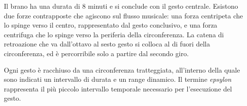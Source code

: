 \documentclass{book}
\begin{document}
\def\circleRadius{11cm}  %
\def\numCards{11}  %
\def\angleOffset{30}  %
\def\pointWidth{3pt}
\def\minimumSize{1.5pt}
\def\arrowWidth{6pt}
\def\arrowLength{9pt}
\def\sumWidth{1pt}
\def\lineWidthMore{3pt}
\def\lineWidthMedium{\lineWidthMore-1.5}
\def\lineWidth{\lineWidthMore-2.5pt}
\def\arrowWidthMore{9pt}
\def\arrowLengthMore{12pt}
\def\sumWidthMore{3pt}
\def\roundedCorners{8pt}
\def\cardRadius{2.1cm} 
\def\cardRadiusTwo{\cardRadius + .5cm} 
\def\battenteheight{.25}
\def\battentewidth{1.3}




Il brano ha una durata di 8 minuti e si conclude con il gesto centrale.
Esistono due forze contrapposte che agiscono sul flusso musicale: una forza centripeta che lo spinge verso il centro, rappresentato dal gesto conclusivo, e una forza centrifuga che lo spinge verso la periferia della circonferenza.
La catena di retroazione che va dall'ottavo al sesto gesto si colloca al di fuori della circonferenza, ed è percorribile solo a partire dal secondo giro.

\null
\quad  %

\begin{minipage}{0.2\textwidth}
\end{minipage}%
\begin{minipage}{0.6\textwidth}
\justify  Ogni gesto è racchiuso da una circonferenza tratteggiata, all'interno della quale sono indicati un intervallo di durata e un range dinamico.
Il termine \textit{epsylon} rappresenta il più piccolo intervallo temporale necessario per l'esecuzione del gesto.
\end{minipage}
\end{document}
